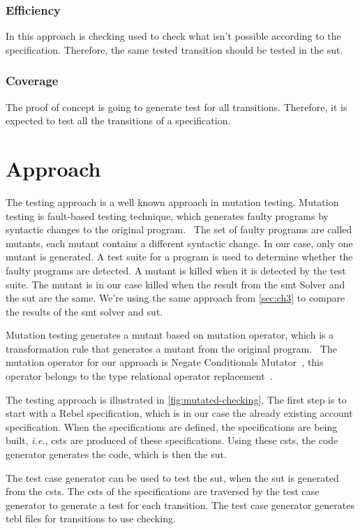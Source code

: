\subsubsection{Efficiency}
In this approach is checking used to check what isn't possible according to the
specification. Therefore, the same tested transition should be tested in the
\gls{sut}.

\subsubsection{Coverage}
The proof of concept is going to generate test for all transitions. Therefore,
it is expected to test all the transitions of a specification.

\section{Approach}
The testing approach is a well known approach in mutation testing. Mutation testing is
fault-based testing technique, which generates faulty programs by syntactic
changes to the original program.~\cite[p.~1]{jia2011analysis} The set of faulty
programs are called mutants, each mutant contains a different syntactic change.
In our case, only one mutant is generated. A test suite for a program is used to
determine whether the faulty programs are detected. A mutant is killed when it
is detected by the test suite. The mutant is in our case killed when the result
from the \gls{smt} Solver and the \gls{sut} are the same. We're using the same
approach from \autoref{sec:ch3} to compare the results of the \gls{smt} solver and
\gls{sut}.

Mutation testing generates a mutant based on
mutation operator, which is a transformation rule that generates a mutant from
the original program.~\cite[p.~3-4]{jia2011analysis} The mutation operator for
our approach is Negate Conditionals Mutator~\cite{pitmutators}, this operator
belongs to the type relational operator
replacement~\cite[p.~688]{king1991fortran}.

The testing approach is illustrated in \autoref{fig:mutated-checking}. The first
step is to start with a Rebel specification, which is in our case the already
existing account specification. When the specifications are defined, the
specifications are being built, \textit{i.e.}, \gls{csts} are
produced of these specifications. Using these \gls{csts}, the code generator generates
the code, which is then the \gls{sut}.

The test case generator can be used to test the \gls{sut}, when the \gls{sut} is generated
from the \gls{csts}. The \gls{csts} of the specifications are traversed by the test case
generator to generate a test for each transition. The test case generator
generates tebl files for transitions to use checking.

